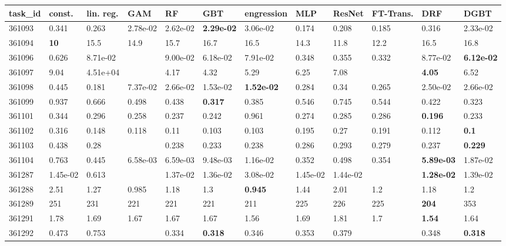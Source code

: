 \begin{table}[ht!]
\centering
\begingroup\footnotesize
\begin{tabular}{llllllllllll}
  \hline
\hline
task\_id & const. & lin. reg. & GAM & RF & GBT & engression & MLP & ResNet & FT-Trans. & DRF & DGBT \\ 
  \hline
361093 & 0.341 & 0.263 & 2.78e-02 & 2.62e-02 & \textbf{2.29e-02} & 3.06e-02 & 0.174 & 0.208 & 0.185 & 0.316 & 2.33e-02 \\ 
  361094 & \textbf{10} & 15.5 & 14.9 & 15.7 & 16.7 & 16.5 & 14.3 & 11.8 & 12.2 & 16.5 & 16.8 \\ 
  361096 & 0.626 & 8.71e-02 &  & 9.00e-02 & 6.18e-02 & 7.91e-02 & 0.348 & 0.355 & 0.332 & 8.77e-02 & \textbf{6.12e-02} \\ 
  361097 & 9.04 & 4.51e+04 &  & 4.17 & 4.32 & 5.29 & 6.25 & 7.08 &  & \textbf{4.05} & 6.52 \\ 
  361098 & 0.445 & 0.181 & 7.37e-02 & 2.66e-02 & 1.53e-02 & \textbf{1.52e-02} & 0.284 & 0.34 & 0.265 & 2.50e-02 & 2.66e-02 \\ 
  361099 & 0.937 & 0.666 & 0.498 & 0.438 & \textbf{0.317} & 0.385 & 0.546 & 0.745 & 0.544 & 0.422 & 0.323 \\ 
  361101 & 0.344 & 0.296 & 0.258 & 0.237 & 0.242 & 0.961 & 0.274 & 0.285 & 0.286 & \textbf{0.196} & 0.233 \\ 
  361102 & 0.316 & 0.148 & 0.118 & 0.11 & 0.103 & 0.103 & 0.195 & 0.27 & 0.191 & 0.112 & \textbf{0.1} \\ 
  361103 & 0.438 & 0.28 &  & 0.238 & 0.233 & 0.238 & 0.286 & 0.293 & 0.279 & 0.237 & \textbf{0.229} \\ 
  361104 & 0.763 & 0.445 & 6.58e-03 & 6.59e-03 & 9.48e-03 & 1.16e-02 & 0.352 & 0.498 & 0.354 & \textbf{5.89e-03} & 1.87e-02 \\ 
  361287 & 1.45e-02 & 0.613 &  & 1.37e-02 & 1.36e-02 & 3.08e-02 & 1.45e-02 & 1.44e-02 &  & \textbf{1.28e-02} & 1.39e-02 \\ 
  361288 & 2.51 & 1.27 & 0.985 & 1.18 & 1.3 & \textbf{0.945} & 1.44 & 2.01 & 1.2 & 1.18 & 1.2 \\ 
  361289 & 251 & 231 & 221 & 221 & 221 & 211 & 225 & 226 & 225 & \textbf{204} & 353 \\ 
  361291 & 1.78 & 1.69 & 1.67 & 1.67 & 1.67 & 1.56 & 1.69 & 1.81 & 1.7 & \textbf{1.54} & 1.64 \\ 
  361292 & 0.473 & 0.753 &  & 0.334 & \textbf{0.318} & 0.346 & 0.353 & 0.379 &  & 0.348 & \textbf{0.318} \\ 

\end{tabular}
\end{table}
